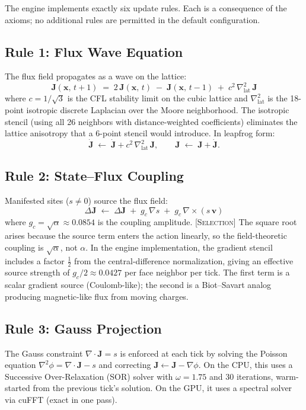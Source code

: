 \documentclass[11pt,a4paper]{article}
\newcommand{\etag}[1]{{\normalfont\textsc{\footnotesize [#1]}}}
\theoremstyle{compact}
\begin{document}
The engine implements exactly six update rules. Each is a consequence of the axioms; no additional rules are permitted in the default configuration.

\subsection*{Rule 1: Flux Wave Equation \quad\normalfont\etag{Theorem}}

The flux field propagates as a wave on the lattice:
\[
\mathbf{J}(\mathbf{x},\, t+1) \;=\; 2\,\mathbf{J}(\mathbf{x},\, t) \;-\; \mathbf{J}(\mathbf{x},\, t-1) \;+\; c^2\,\nabla^2_{\mathrm{lat}}\,\mathbf{J}
\]
where $c = 1/\sqrt{3}$ is the CFL stability limit on the cubic lattice and $\nabla^2_{\mathrm{lat}}$ is the 18-point isotropic discrete Laplacian over the Moore neighborhood. The isotropic stencil (using all 26 neighbors with distance-weighted coefficients) eliminates the lattice anisotropy that a 6-point stencil would introduce. In leapfrog form:
\[
\dot{\mathbf{J}} \;\leftarrow\; \dot{\mathbf{J}} + c^2\,\nabla^2_{\mathrm{lat}}\,\mathbf{J}, \qquad \mathbf{J} \;\leftarrow\; \mathbf{J} + \dot{\mathbf{J}}.
\]

\subsection*{Rule 2: State--Flux Coupling \quad\normalfont\etag{Theorem}}

Manifested sites ($s \neq 0$) source the flux field:
\[
\Delta\mathbf{J} \;\leftarrow\; \Delta\mathbf{J} \;+\; g_c\,\nabla s \;+\; g_c\,\nabla \times (s\,\mathbf{v})
\]
where $g_c = \sqrt{\alpha} \approx 0.0854$ is the coupling amplitude. \etag{Selection} The square root arises because the source term enters the action linearly, so the field-theoretic coupling is $\sqrt{\alpha}$, not $\alpha$. In the engine implementation, the gradient stencil includes a factor $\tfrac{1}{2}$ from the central-difference normalization, giving an effective source strength of $g_c/2 \approx 0.0427$ per face neighbor per tick. The first term is a scalar gradient source (Coulomb-like); the second is a Biot--Savart analog producing magnetic-like flux from moving charges.

\subsection*{Rule 3: Gauss Projection \quad\normalfont\etag{Theorem}}

The Gauss constraint $\nabla \cdot \mathbf{J} = s$ is enforced at each tick by solving the Poisson equation $\nabla^2 \phi = \nabla \cdot \mathbf{J} - s$ and correcting $\mathbf{J} \leftarrow \mathbf{J} - \nabla\phi$. On the CPU, this uses a Successive Over-Relaxation (SOR) solver with $\omega = 1.75$ and 30 iterations, warm-started from the previous tick's solution. On the GPU, it uses a spectral solver via cuFFT (exact in one pass).
\end{document}
